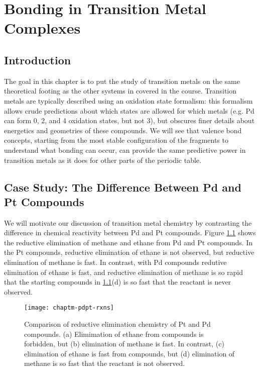 \chapter{Bonding in Transition Metal Complexes}

\section{Introduction}
The goal in this chapter is to put the study of transition metals on
the same theoretical footing as the other systems in covered in
the course. Transition metals are typically described using an
oxidation state formalism: this formalism allows crude predictions
about which states are allowed for which metals (e.g. Pd can form 0,
2, and 4 oxidation states, but not 3), but obscures finer details
about energetics and geometries of these compounds. We will see that
valence bond concepts, starting from the most stable configuration of
the fragments to understand what bonding can occur, can provide the
same predictive power in transition metals as it does for other parts
of the periodic table.

\section{Case Study: The Difference Between Pd and Pt Compounds}
We will motivate our discussion of transition metal chemistry by
contrasting the difference in chemical reactivity between Pd and Pt
compounds. Figure \ref{chaptm-fig-pdpt-rxns} shows the reductive
elimination of methane and ethane from Pd and Pt compounds. In the Pt
compounds, reductive elimination of ethane is not observed, but
reductive elimination of methane is fast. In contrast, with Pd
compounds redutive elimination of ethane is fast, and reductive
elimination of methane is so rapid that the starting compounds in
\ref{chaptm-fig-pdpt-rxns}(d) is so fast that the reactant is never
observed.

\begin{figure}
\begin{center}
\texttt{[image: chaptm-pdpt-rxns]}
\end{center}
\caption{Comparison of reductive elimination chemistry of Pt and Pd
  compounds. (a) Elimimation of ethane from  compounds
  is forbidden, but (b) elimination of methane is fast. In contrast,
  (c) elimination of ethane is fast from  compounds, but
  (d) elimination of methane is so fast that the reactant is not
  observed.} 
\label{chaptm-fig-pdpt-rxns}
\end{figure}

